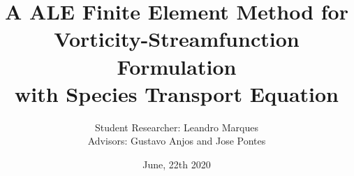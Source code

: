 

\usepackage[T1]{fontenc} %
\usepackage[utf8]{inputenc} %
\usepackage[portuguese]{babel} %
\usepackage{cite} %
\usepackage{epsf,epsfig,psfig} %
\usepackage{fancyhdr} %
\usepackage{setspace} %
\usepackage{float} %
\usepackage{makeidx} %
\usepackage{amsmath,amssymb,bm,amsbsy} %
\usepackage{mathtools} %
\usepackage{lipsum} %
\usepackage{tikz}
\usetikzlibrary{patterns}
\usepackage{relsize}
\usetikzlibrary{shapes,arrows,arrows.meta,matrix}
\usepackage{ragged2e}

\justifying \title[]{A ALE Finite Element Method for \\ Vorticity-Streamfunction Formulation \\ with Species Transport Equation}
\subtitle{}
\author{\vspace{0.5cm} Student Researcher: Leandro Marques \\ Advisors: Gustavo Anjos and Jose Pontes}

\date{June, 22th 2020}


\beamertemplatenavigationsymbolsempty 


